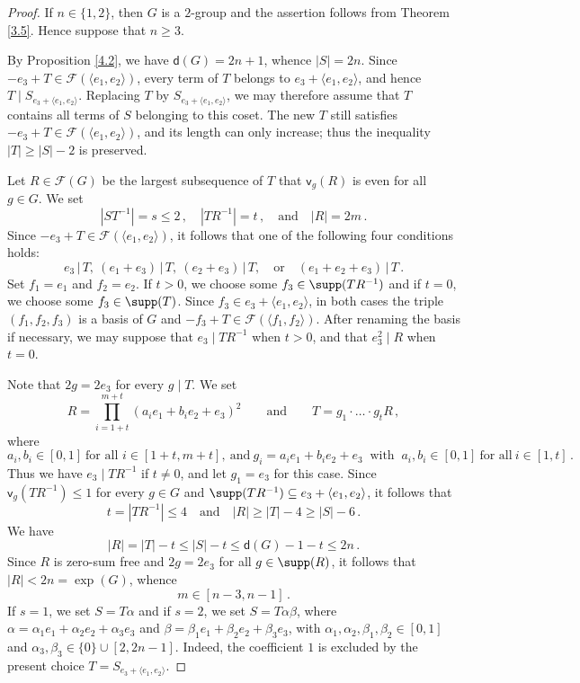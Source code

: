 \documentclass[a4paper, 10pt]{amsart}
\theoremstyle{plain}
\theoremstyle{definition}
\renewcommand{\t}{\, | \,}
\renewcommand{\t}{\, | \,}
\numberwithin{equation}{section}
\begin{document}
{\begin{proof}
If $n\in\{1,2\}$, then $G$ is a $2$-group and the assertion follows from Theorem \ref{3.5}. Hence suppose that $n\ge 3$.

By Proposition \ref{4.2}, we have $\mathsf d (G) = 2n+1$, whence $|S|=2n$.
Since $-e_3+T\in\mathcal F(\langle e_1,e_2\rangle)$, every term of $T$ belongs to $e_3+\langle e_1,e_2\rangle$, and hence $T\mid S_{e_3+\langle e_1,e_2\rangle}$. Replacing $T$ by $S_{e_3+\langle e_1,e_2\rangle}$, we may therefore assume that $T$ contains all terms of $S$ belonging to this coset. The new $T$ still satisfies $-e_3+T\in\mathcal F(\langle e_1,e_2\rangle)$, and its length can only increase; thus the inequality $|T|\ge |S|-2$ is preserved.

	Let $R \in \mathcal F (G)$ be the largest subsequence of $T$ that $\mathsf v_g (R)$ is even for all $g \in G$. We set  
\[
|ST^{-1}|=s\le 2 \,,  \quad |TR^{-1}|=t \,, \quad \text{and} \quad   |R|=2m \,.
\] 
Since $-e_3+T \in \mathcal F ( \langle e_1, e_2 \rangle)$, it follows that one of the following four conditions holds:
\[
e_3 \t T, \ (e_1+e_3) \t T, \ (e_2+e_3) \t T , \quad \text{or} \quad (e_1+e_2+e_3) \t T \,.
\]
Set $f_1=e_1$ and $f_2=e_2$. If $t > 0$, we choose some $f_3 \in \supp ( TR^{-1})$ and if $t=0$, we choose some $f_3\in\supp(T)$. Since $f_3\in e_3+\langle e_1,e_2\rangle$, in both cases the triple $(f_1, f_2, f_3)$ is a basis of $G$ and  $-f_3+T\in\mathcal F(\langle f_1,f_2\rangle)$. After renaming the basis if necessary, we may suppose that $e_3\mid TR^{-1}$ when $t>0$, and that $e_3^2\mid R$ when $t=0$. 


Note that  $2g=2e_3$ for every $g\mid T$. 
We set
\begin{equation}\label{def_R}
R = \prod_{i=1+t}^{m+t} (a_ie_1+b_ie_2 + e_3)^2 \qquad \text{and} \qquad T= g_1 \cdot \ldots \cdot  g_t R \,, 
\end{equation}
where
\[
a_i, b_i \in [0,1] \ \text{for all } i \in [1+t,m+t] , \ \text{and} \ g_i=a_ie_1+b_ie_2 + e_3 \ \text{ with } \ a_i, b_i \in [0,1] \ \text{for all} \ i \in [1,t] \,.
\]
Thus we have $e_3\mid TR^{-1}$ if $t\ne 0$, and let $g_1=e_3$ for this case. Since $\mathsf v_g (TR^{-1})\le 1$ for every $g\in G$ and $\supp (TR^{-1}) \subseteq e_3+ \langle e_1,e_2\rangle$, it follows that  
\[
t=|TR^{-1}|\le 4 \quad \text{and} \quad  |R|\ge |T|-4\ge |S|-6 \,.
\] 
We have
\[
|R| = |T|-t \le |S|-t \le \mathsf d (G)-1 -t \le 2n \,.
\]
Since $R$ is zero-sum free and $2g=2e_3$ for all $g \in \supp (R)$, it follows that $|R| < 2n = \exp (G)$, whence
\begin{equation}
m\in[n-3,n-1] \,.
\end{equation}
  If $s=1$, we set $S = T \alpha$ and if $s=2$, we set $S=T \alpha \beta$, where $\alpha = \alpha_1 e_1 + \alpha_2 e_2 + \alpha_3 e_3$ and $\beta = \beta_1 e_1 + \beta_2 e_2 + \beta_3 e_3$, with $\alpha_1, \alpha_2, \beta_1, \beta_2 \in [0,1]$ and $\alpha_3, \beta_3 \in \{0\}\cup [2, 2n-1]$. Indeed, the coefficient $1$ is excluded by the present choice $T=S_{e_3+\langle e_1,e_2\rangle}$.
 

\end{proof}}
\end{document}
